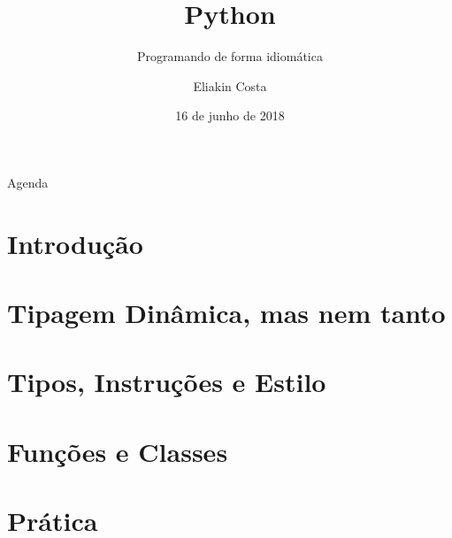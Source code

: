 \documentclass{beamer}
\title{Python}
\subtitle{Programando de forma idiomática}
\author{Eliakin Costa}
\date{16 de junho de 2018}
\institute{Instituto Federal da Bahia\\
campus Salvador\\
\url{eliakin.costa@kde.con}
}
\begin{document}
\begin{frame}[t]
	\maketitle
\end{frame}

\begin{frame}[t]{Agenda}
\tableofcontents
\end{frame}

\def\sectionname{}
\def\insertsectionnumber{}
\def\subsectionname{}
\def\insertsubsectionnumber{}

\AtBeginSection{\frame{\sectionpage}\addtocounter{framenumber}{-1}}


\AtBeginSubsection{\frame{\subsectionpage}\addtocounter{framenumber}{-1} }
\AtBeginSubsubsection{\frame{\subsubsectionpage}\addtocounter{framenumber}{-1} }






\section{Introdução}


\section{Tipagem Dinâmica, mas nem tanto}


\section{Tipos, Instruções e Estilo}


\section{Funções e Classes}


\section{Prática}



\end{document}
